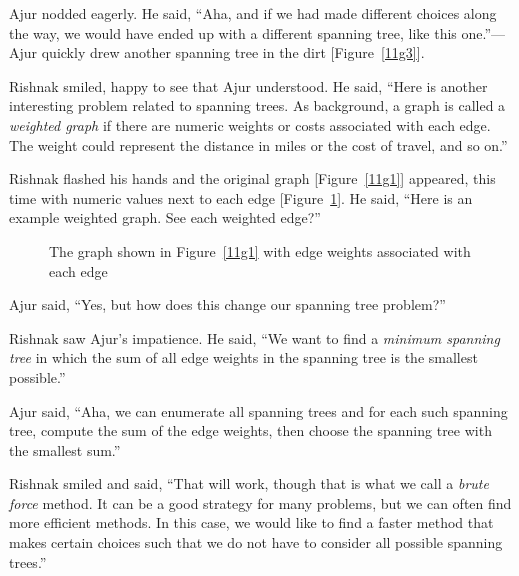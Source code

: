 Ajur nodded eagerly. He said, ``Aha, and if we had made different choices along the way, we would have ended up with a different spanning tree, like this one.''---Ajur quickly drew another spanning tree in the dirt [Figure~\ref{11g3}].

Rishnak smiled, happy to see that Ajur understood. He said, ``Here is another interesting problem related to spanning trees. As background, a graph is called a \textit{weighted graph} if there are numeric weights or costs associated with each edge. The weight could represent the distance in miles or the cost of travel, and so on.''

Rishnak flashed his hands and the original graph [Figure~\ref{11g1}] appeared, this time with numeric values next to each edge [Figure~\ref{11g7}]. He said, ``Here is an example weighted graph. See each weighted edge?''

\begin{figure}
\begin{center}
\caption{The graph shown in Figure~\ref{11g1} with edge weights associated with each edge}\label{11g7}
\end{center}
\end{figure}

Ajur said, ``Yes, but how does this change our spanning tree problem?''

Rishnak saw Ajur's impatience. He said, ``We want to find a \textit{minimum spanning tree} in which the sum of all edge weights in the spanning tree is the smallest possible.'' 

Ajur said, ``Aha, we can enumerate all spanning trees and for each such spanning tree, compute the sum of the edge weights, then choose the spanning tree with the smallest sum.''

Rishnak smiled and said, ``That will work, though that is what we call a \textit{brute force} method. It can be a good strategy for many problems, but we can often find more efficient methods. In this case, we would like to find a faster method that makes certain choices such that we do not have to consider all possible spanning trees.''

